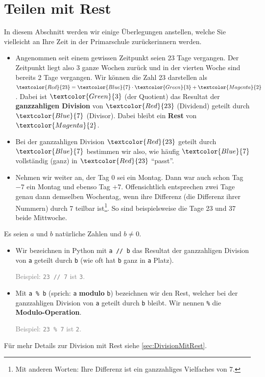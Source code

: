 \section{Teilen mit Rest}
In diesem Abschnitt werden wir einige Überlegungen anstellen, welche Sie vielleicht an Ihre Zeit in der Primarschule zurückerinnern werden.
\begin{myexample}\label{myexample:teilenMitRest}
\leavevmode
\begin{itemize}
	\item Angenommen seit einem gewissen Zeitpunkt seien 23 Tage vergangen. Der Zeitpunkt liegt also 3 ganze Wochen zurück und in der vierten Woche sind bereits 2 Tage vergangen.
	      Wir können die Zahl 23 darstellen als $\textcolor{Red}{23} = \textcolor{Blue}{7}\cdot \textcolor{Green}{3} + \textcolor{Magenta}{2}$. Dabei ist $\textcolor{Green}{3}$ (der Quotient) das Resultat der \textbf{ganzzahligen Division} von $\textcolor{Red}{23}$ (Dividend) geteilt durch $\textcolor{Blue}{7}$ (Divisor). Dabei bleibt ein \textbf{Rest} von $\textcolor{Magenta}{2}$.
	\item Bei der ganzzahligen Division $\textcolor{Red}{23}$ geteilt durch $\textcolor{Blue}{7}$ bestimmen wir also, wie häufig $\textcolor{Blue}{7}$ vollständig (ganz) in  $\textcolor{Red}{23}$ \enquote{passt}.
	\item Nehmen wir weiter an, der Tag 0 sei ein Montag. Dann war auch schon Tag $-7$ ein Montag und ebenso Tag $+7$.
	      Offensichtlich entsprechen zwei Tage genau dann demselben Wochentag, wenn ihre Differenz (die Differenz ihrer Nummern) durch 7 teilbar ist\footnote{Mit anderen Worten: Ihre Differenz ist ein ganzzahliges Vielfaches von 7.}.
	      So sind beispielsweise die Tage 23 und 37 beide Mittwoche.
\end{itemize}
\end{myexample}

\begin{mydefinition}
Es seien $a$ und $b$ natürliche Zahlen und $b\neq 0$.
\begin{itemize}
	\item Wir bezeichnen in Python mit \lstinline{a // b} das Resultat der ganzzahligen Division von \lstinline{a} geteilt durch \lstinline{b} (wie oft hat \lstinline{b} ganz in \lstinline{a} Platz).

	      \textcolor{Gray}{Beispiel: \texttt{23 // 7} ist \texttt{3}.}
	\item Mit \texttt{a \% b} (sprich: \texttt{a} \textbf{modulo} \texttt{b}) bezeichnen wir den Rest, welcher bei der ganzzahligen Division von \lstinline{a} geteilt durch \lstinline{b} bleibt. Wir nennen \texttt{\%} die \textbf{Modulo-Operation}.

	      \textcolor{Gray}{Beispiel: \texttt{23 \% 7} ist \texttt{2}.}
\end{itemize}
Für mehr Details zur Division mit Rest siehe \cref{sec:DivisionMitRest}.
\end{mydefinition}

